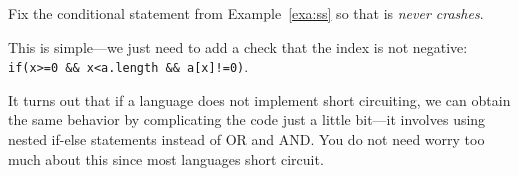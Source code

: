 \begin{exer}
Fix the conditional statement from Example~\ref{exa:ss}
so that is {\em never crashes}.

\vspace*{1in}
\begin{answer} This is simple---we just need to add a check
that the index is not negative:\\
\verb+if(x>=0 && x<a.length && a[x]!=0)+.
\end{answer}
\end{exer}

\begin{rem}
It turns out that if a language does not implement short circuiting,
we can obtain the same behavior by complicating the code just
a little bit---it involves using nested if-else statements instead of OR
and AND. You do not need worry too much about this since
most languages short circuit.
\end{rem}
%
%




